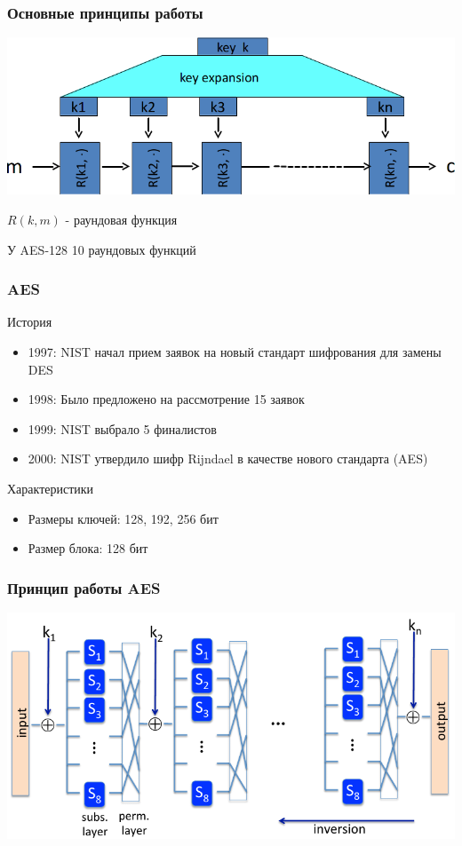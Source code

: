 \documentclass{beamer}
\begin{document}
\begin{frame}
  \frametitle{Основные принципы работы}

  \includegraphics[width=\linewidth]{images/png/work_principle.png}

  \vspace{1em}

  $R(k,m)$ - раундовая функция

  У AES-128 10 раундовых функций
\end{frame}


\begin{frame}
  \frametitle{AES}

  \begin{block}{История}
    \begin{itemize}
      \item{1997: NIST начал прием заявок на новый стандарт шифрования для замены DES}
      \item{1998: Было предложено на рассмотрение 15 заявок}
      \item{1999: NIST выбрало 5 финалистов}
      \item{2000: NIST утвердило шифр Rijndael в качестве нового стандарта (AES)}
    \end{itemize}
  \end{block}

  \begin{block}{Характеристики}
    \begin{itemize}
      \item{Размеры ключей: 128, 192, 256 бит}
      \item{Размер блока: 128 бит}
    \end{itemize}
  \end{block}
\end{frame}

\begin{frame}
  \frametitle{Принцип работы AES}

  \includegraphics[width=\linewidth]{images/png/AES_network}
\end{frame}
\end{document}
